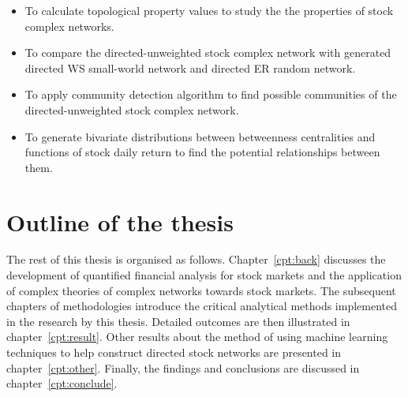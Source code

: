 \begin{itemize}
	\item To calculate topological property values to study the the properties of stock complex networks.
	\item To compare the directed-unweighted stock complex network with generated directed WS small-world network and directed ER random network.
	\item To apply community detection algorithm to find possible communities of the directed-unweighted stock complex network.
	\item To generate bivariate distributions between betweenness centralities and functions of stock daily return to find the potential relationships between them.
\end{itemize}

\section{Outline of the thesis}
The rest of this thesis is organised as follows. Chapter~\ref{cpt:back} discusses the development of quantified financial analysis for stock markets and the application of complex theories of complex networks towards stock markets. The subsequent chapters of methodologies introduce the critical analytical methods implemented in the research by this thesis. Detailed outcomes are then illustrated in chapter~\ref{cpt:result}. Other results about the method of using machine learning techniques to help construct directed stock networks are presented in chapter~\ref{cpt:other}. Finally, the findings and conclusions are discussed in chapter~\ref{cpt:conclude}.
